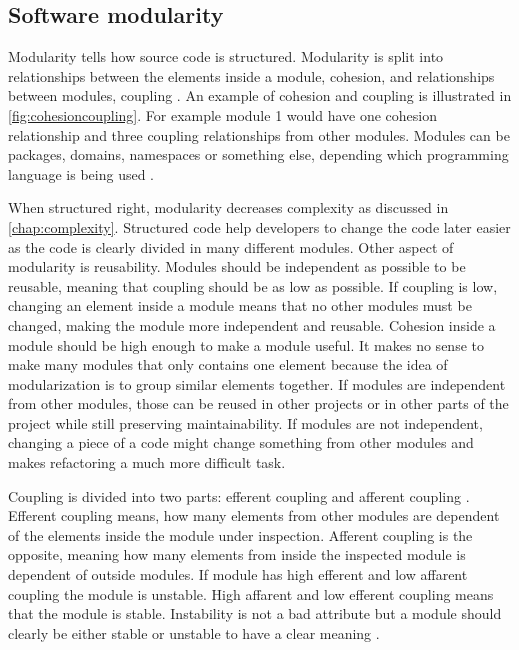 \subsection{Software modularity}
\label{chap:modularity}

Modularity tells how source code is structured. Modularity is split into relationships between the elements inside a module, cohesion, and relationships between modules, coupling \cite{stevens1999structured}. An example of cohesion and coupling is illustrated in \autoref{fig:cohesioncoupling}. For example module 1 would have one cohesion relationship and three coupling relationships from other modules. Modules can be packages, domains, namespaces or something else, depending which programming language is being used \cite{gupta2009package}.

When structured right, modularity decreases complexity as discussed in \autoref{chap:complexity}. Structured code help developers to change the code later easier as the code is clearly divided in many different modules. Other aspect of modularity is reusability. Modules should be independent as possible to be reusable, meaning that coupling should be as low as possible. If coupling is low, changing an element inside a module means that no other modules must be changed, making the module more independent and reusable. Cohesion inside a module should be high enough to make a module useful. It makes no sense to make many modules that only contains one element because the idea of modularization is to group similar elements together. If modules are independent from other modules, those can be reused in other projects or in other parts of the project while still preserving maintainability. If modules are not independent, changing a piece of a code might change something from other modules and makes refactoring a much more difficult task.

Coupling is divided into two parts: efferent coupling and afferent coupling \cite{gupta2009package}. Efferent coupling means, how many elements from other modules are dependent of the elements inside the module under inspection. Afferent coupling is the opposite, meaning how many elements from inside the inspected module is dependent of outside modules. If module has high efferent and low affarent coupling the module is unstable. High affarent and low efferent coupling means that the module is stable. Instability is not a bad attribute but a module should clearly be either stable or unstable to have a clear meaning \cite{gupta2009package}.

